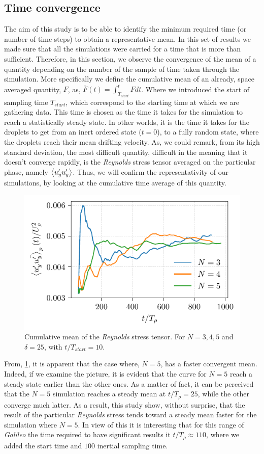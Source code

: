 \subsection{Time convergence}

The aim of this study is to be able to identify the minimum required time (or number of time steps) to obtain a representative mean. 
In this set of results we made sure that all the simulations were carried for a time that is more than sufficient. 
Therefore, in this section, we observe the convergence of the mean of a quantity depending on the number of the sample of time taken through the simulation.
More specifically we define the cumulative mean of an already, space averaged quantity, $F$, as, 
$\bar{F}(t) = \int_{T_{start}}^{t} F dt$. 
Where we introduced the start of sampling time $T_{start}$, which correspond to the starting time at which we are gathering data. 
This time is chosen as the time it takes for the simulation to reach a statistically steady state.
In other worlds, it is the time it takes for the droplets to get from an inert ordered state ($t = 0$), to a fully random state, where the droplets reach their mean drifting velocity.
As, we could remark, from its high standard deviation, the most difficult quantity, difficult in the meaning that it doesn't converge rapidly, is the \textit{Reynolds} stress tensor averaged on the particular phase, namely $\left<u'_yu'_y\right>$.
Thus, we will confirm the representativity of our simulations, by looking at the cumulative time average of this quantity. 
\begin{figure}
    \centering
    \includegraphics[height = 0.3 \textwidth]{image/VALIDATION/time/UpUp.pdf}
    \caption{Cumulative mean of the \textit{Reynolds} stress tensor. For $N = 3,4,5$ and $\delta = 25$, with $t/T_{start} = 10$.}
    \label{fig:VALIDATION_cumul_mean}
\end{figure}
From, \ref{fig:VALIDATION_cumul_mean}, it is apparent that the case where, $N=5$, has a faster convergent mean. 
Indeed, if we examine the picture, it is evident that the curve for $N=5$ reach a steady state earlier than the other ones. 
As a matter of fact, it can be perceived that the $N=5$ simulation reaches a steady mean at $t/T_\rho = 25$, while the other converge much latter. 
As a result, this study show, without surprise, that the result of the particular \textit{Reynolds} stress tends toward a steady mean faster for the simulation where $N=5$. 
In view of this it is interesting that for this range of \textit{Galileo} the time required to have significant results it $t/T_{\rho} \approx 110$, where we added the start time and $100$ inertial sampling time. 


